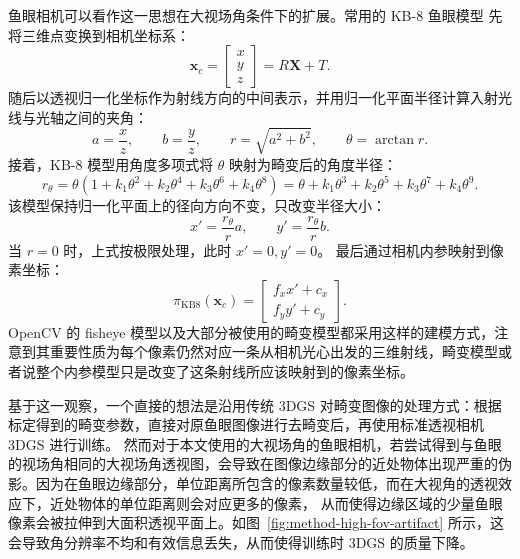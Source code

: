 鱼眼相机可以看作这一思想在大视场角条件下的扩展。常用的 KB-8 鱼眼模型 \cite{kannala2006generic} 先将三维点变换到相机坐标系：
\begin{equation}
    \mathbf{x}_c=
    \left[
    \begin{array}{c}
        x \\
        y \\
        z
    \end{array}
    \right]
    =
    R\mathbf{X}+T.
\end{equation}
随后以透视归一化坐标作为射线方向的中间表示，并用归一化平面半径计算入射光线与光轴之间的夹角：
\begin{equation}
    a=\frac{x}{z},
    \qquad
    b=\frac{y}{z},
    \qquad
    r=\sqrt{a^2+b^2},
    \qquad
    \theta=\arctan r.
\end{equation}
接着，KB-8 模型用角度多项式将 \(\theta\) 映射为畸变后的角度半径：
\begin{equation}
    r_\theta
    =
    \theta
    \left(1+k_1\theta^2+k_2\theta^4+k_3\theta^6+k_4\theta^8\right)
    =
    \theta+k_1\theta^3+k_2\theta^5+k_3\theta^7+k_4\theta^9.
\end{equation}
该模型保持归一化平面上的径向方向不变，只改变半径大小：
\begin{equation}
    x'=\frac{r_\theta}{r}a,
    \qquad
    y'=\frac{r_\theta}{r}b.
\end{equation}
当 \(r=0\) 时，上式按极限处理，此时 \(x'=0,y'=0\)。
最后通过相机内参映射到像素坐标：
\begin{equation}
    \label{equ:method-kb8-projection}
    \pi_{\mathrm{KB8}}(\mathbf{x}_c)
    =
    \left[
    \begin{array}{c}
        f_xx'+c_x \\
        f_yy'+c_y
    \end{array}
    \right].
\end{equation}
OpenCV 的 fisheye 模型以及大部分被使用的畸变模型都采用这样的建模方式，注意到其重要性质为每个像素仍然对应一条从相机光心出发的三维射线，畸变模型或者说整个内参模型只是改变了这条射线所应该映射到的像素坐标。

基于这一观察，一个直接的想法是沿用传统 3DGS 对畸变图像的处理方式：根据标定得到的畸变参数，直接对原鱼眼图像进行去畸变后，再使用标准透视相机 3DGS 进行训练。
然而对于本文使用的大视场角的鱼眼相机，若尝试得到与鱼眼的视场角相同的大视场角透视图，会导致在图像边缘部分的近处物体出现严重的伪影。因为在鱼眼边缘部分，单位距离所包含的像素数量较低，而在大视角的透视效应下，近处物体的单位距离则会对应更多的像素，
从而使得边缘区域的少量鱼眼像素会被拉伸到大面积透视平面上。如图~\ref{fig:method-high-fov-artifact} 所示，这会导致角分辨率不均和有效信息丢失，从而使得训练时 3DGS 的质量下降。

